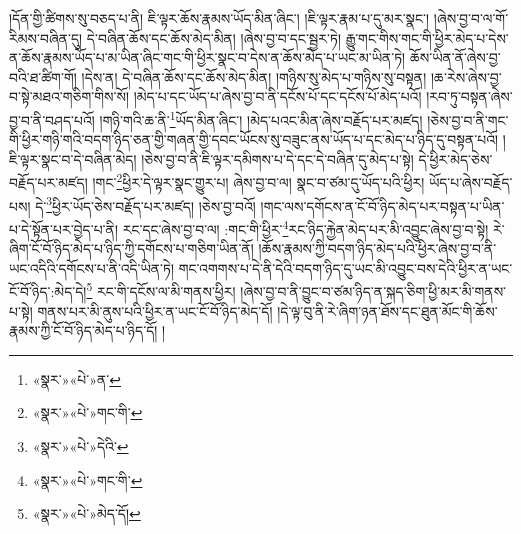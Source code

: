 །དོན་གྱི་ཚིགས་སུ་བཅད་པ་ནི། ཇི་ལྟར་ཆོས་རྣམས་ཡོད་མིན་ཞིང་། །ཇི་ལྟར་རྣམ་པ་དུ་མར་སྣང་། །ཞེས་བྱ་བ་ལ་གོ་རིམས་བཞིན་དུ། དེ་བཞིན་ཆོས་དང་ཆོས་མེད་མིན། །ཞེས་བྱ་བ་དང་སྦྱར་ཏེ། རྒྱུ་གང་གིས་གང་གི་ཕྱིར་མེད་པ་དེས་ན་ཆོས་རྣམས་ཡོད་པ་མ་ཡིན་ཞིང་གང་གི་ཕྱིར་སྣང་བ་དེས་ན་ཆོས་མེད་པ་ཡང་མ་ཡིན་ཏེ། ཆོས་ཡིན་ནོ་ཞེས་བྱ་བའི་ཐ་ཚིག་གོ། །དེས་ན། དེ་བཞིན་ཆོས་དང་ཆོས་མེད་མིན། །གཉིས་སུ་མེད་པ་གཉིས་སུ་བསྟན། །ཆ་རེས་ཞེས་བྱ་བ་སྟེ་མཐའ་གཅིག་གིས་སོ། །མེད་པ་དང་ཡོད་པ་ཞེས་བྱ་བ་ནི་དངོས་པོ་དང་དངོས་པོ་མེད་པའོ། །རབ་ཏུ་བསྟན་ཞེས་བྱ་བ་ནི་བཤད་པའོ། །གཉི་གའི་ཆ་ནི་\footnote{«སྣར་»«པེ་»ན་}ཡོད་མིན་ཞིང་། །མེད་པའང་མིན་ཞེས་བརྗོད་པར་མཛད། །ཅེས་བྱ་བ་ནི་གང་གི་ཕྱིར་གཉི་གའི་བདག་ཉིད་ཅན་གྱི་གཞན་གྱི་དབང་ཡོངས་སུ་བཟུང་ནས་ཡོད་པ་དང་མེད་པ་ཉིད་དུ་བསྟན་པའོ། །ཇི་ལྟར་སྣང་བ་དེ་བཞིན་མེད། །ཅེས་བྱ་བ་ནི་ཇི་ལྟར་དམིགས་པ་དེ་དང་དེ་བཞིན་དུ་མེད་པ་སྟེ། དེ་ཕྱིར་མེད་ཅེས་བརྗོད་པར་མཛད། །གང་\footnote{«སྣར་»«པེ་»གང་གི་}ཕྱིར་དེ་ལྟར་སྣང་གྱུར་པ། ཞེས་བྱ་བ་ལ། སྣང་བ་ཙམ་དུ་ཡོད་པའི་ཕྱིར། ཡོད་པ་ཞེས་བརྗོད་པས། དེ་\footnote{«སྣར་»«པེ་»དེའི་}ཕྱིར་ཡོད་ཅེས་བརྗོད་པར་མཛད། །ཅེས་བྱ་བའོ། །གང་ལས་དགོངས་ན་ངོ་བོ་ཉིད་མེད་པར་བསྟན་པ་ཡིན་པ་དེ་སྟོན་པར་བྱེད་པ་ནི། རང་དང་ཞེས་བྱ་བ་ལ། :གང་གི་ཕྱིར་\footnote{«སྣར་»«པེ་»གང་གི་}རང་ཉིད་རྐྱེན་མེད་པར་མི་འབྱུང་ཞེས་བྱ་བ་སྟེ། རེ་ཞིག་ངོ་བོ་ཉིད་མེད་པ་ཉིད་ཀྱི་དགོངས་པ་གཅིག་ཡིན་ནོ། །ཆོས་རྣམས་ཀྱི་བདག་ཉིད་མེད་པའི་ཕྱིར་ཞེས་བྱ་བ་ནི་ཡང་འདིའི་དགོངས་པ་ནི་འདི་ཡིན་ཏེ། གང་འགགས་པ་དེ་ནི་དེའི་བདག་ཉིད་དུ་ཡང་མི་འབྱུང་བས་དེའི་ཕྱིར་ན་ཡང་ངོ་བོ་ཉིད་:མེད་དེ།\footnote{«སྣར་»«པེ་»མེད་དོ།} རང་གི་དངོས་ལ་མི་གནས་ཕྱིར། །ཞེས་བྱ་བ་ནི་བྱུང་བ་ཙམ་ཉིད་ན་སྐད་ཅིག་ཕྱི་མར་མི་གནས་པ་སྟེ། གནས་པར་མི་ནུས་པའི་ཕྱིར་ན་ཡང་ངོ་བོ་ཉིད་མེད་དོ། །དེ་ལྟ་བུ་ནི་རེ་ཞིག་ཉན་ཐོས་དང་ཐུན་མོང་གི་ཆོས་རྣམས་ཀྱི་ངོ་བོ་ཉིད་མེད་པ་ཉིད་དོ། །
